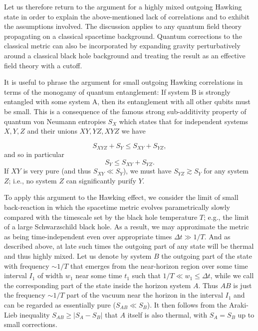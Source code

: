 \documentclass[10pt]{article}
\begin{document}
Let us therefore return to the argument for a highly mixed outgoing Hawking state in order to explain the above-mentioned lack of correlations and to exhibit the assumptions involved.  The discussion applies to any quantum field theory propagating on a classical spacetime background.  Quantum corrections to the classical metric can also be incorporated by expanding gravity perturbatively around a classical black hole background and treating the result as an effective field theory with a cutoff.

It is useful to phrase the argument for small outgoing Hawking correlations in terms of the monogamy of quantum entanglement: If system B is strongly entangled with some system A, then its entanglement with all other qubits must be small.  This is a consequence of the famous strong sub-additivity property of quantum von Neumann entropies $S_X$ which states that for independent systems $X,Y,Z$ and their unions $XY, YZ, XYZ$ we have

\begin{equation}
\label{SSA}
S_{XYZ} + S_Y \le S_{XY} + S_{YZ},
\end{equation}
and so in particular
\begin{equation}
\label{SimpSSA}
S_Y \le S_{XY} + S_{YZ}.
\end{equation}
If $XY$ is very pure (and thus $S_{XY} \ll S_Y$), we must have $S_{YZ} \gtrsim S_Y$  for any system $Z$; i.e., no system $Z$ can significantly purify $Y$.

To apply this argument to the Hawking effect, we consider the limit of small back-reaction in which the spacetime metric evolves parametrically slowly compared with the timescale set by the black hole temperature $T$; e.g., the limit of a large Schwarzschild black hole.  As a result, we may approximate the metric as being time-independent even over appropriate times $\Delta t \gg 1/T$.  And as described above, at late such times the outgoing part of any state will be thermal and thus highly mixed.  Let us denote by system $B$ the outgoing part of the state with frequency $\sim 1/T$ that emerges from the near-horizon region over some time interval $I_1$ of width $w_1$ near some time $t_1$ such that $1/T \ll w_1 \le \Delta t$, while we call the corresponding part of the state inside the horizon system $A$.  Thus $AB$ is just the frequency $\sim 1/T$ part of the vacuum near the horizon in the interval $I_1$ and can be regarded as essentially pure ($S_{AB} \ll S_B$).  It then follows from the Araki-Lieb inequality $S_{AB} \ge |S_A - S_B|$ that $A$ itself is also thermal, with $S_A = S_B$ up to small corrections.
\end{document}
